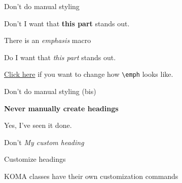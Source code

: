 \documentclass[aspectratio=169]{beamer}
\begin{document}
\begin{frame}[fragile]{Don't do manual styling}

  \begin{exlisting}{Don't}
I want that \textbf{this part} stands out.
  \end{exlisting}

  There is an \emph{emphasis} macro

  \begin{exlisting}{Do}
I want that \emph{this part} stands out.
  \end{exlisting}

  \href{https://github.com/HSR-Stud/Willkommen/blob/master/Guidelines.md#text-and-structure}{Click here} if you want to change how \lstinline!\emph! looks like.

\end{frame}

\begin{frame}[fragile]{Don't do manual styling (bis)}

  {\LARGE \bfseries Never manually create headings}
  
  Yes, I've seen it done.

  \begin{exlisting}{Don't}
\textit{\textsf{My custom heading}} \\[1em]
  \end{exlisting}

\end{frame}

\begin{frame}[fragile]{Customize headings}


  \begin{block}{}
    KOMA classes have their own customization commands
  \end{block}
\end{frame}
\end{document}
